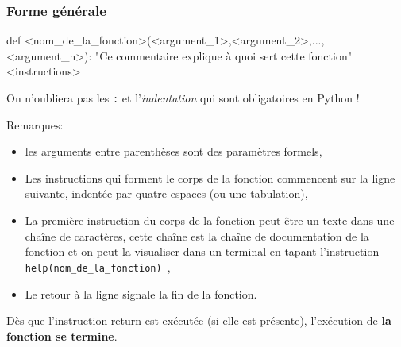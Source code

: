 \begin{frame}[fragile]
\frametitle{Forme générale}

\begin{GrayBox}[0.95\textwidth]
\begin{verbatimtab}[3]
def <nom_de_la_fonction>(<argument_1>,<argument_2>,...,<argument_n>):
	"Ce commentaire explique à quoi sert cette fonction"
	<instructions>
\end{verbatimtab}
\end{GrayBox}
\vspace{-0.5cm}

On n'oubliera pas les \verb?:? et l'\textit{indentation} qui sont obligatoires en Python ! \\
\vspace{0.3cm}

Remarques:\vspace{-0.3cm}
\begin{itemize}
 \item les arguments entre parenthèses sont des paramètres formels,
 \item Les instructions qui forment le corps de la fonction commencent sur la ligne suivante, indentée par quatre espaces (ou une tabulation),
 \item La première instruction du corps de la fonction peut être un texte dans une chaîne de caractères, cette chaîne est la chaîne de documentation de la fonction et on peut la visualiser dans un terminal en tapant l'instruction \verb? help(nom_de_la_fonction) ?,
 \item Le retour à la ligne signale la fin de la fonction.
\end{itemize}

Dès que l'instruction return est exécutée (si elle est présente), l'exécution de \textbf{la fonction se termine}.

\end{frame}

